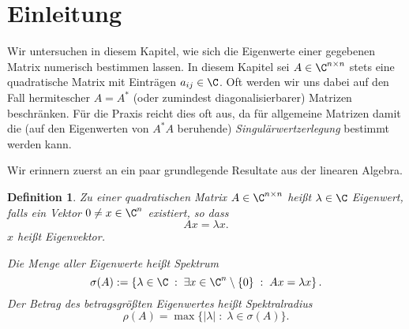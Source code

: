 \documentclass[
]{mycourse}
\theoremstyle{mythm}
\newtheorem{definition}[theorem]{Definition}
\theoremstyle{break}
\newcommand{\dd}{\; : \;}    			      	%
\begin{document}
\section{Einleitung}

Wir untersuchen in diesem Kapitel, wie sich die Eigenwerte einer gegebenen Matrix numerisch bestimmen lassen.
In diesem Kapitel sei $A\in \C^{n\times n}$ stets eine quadratische Matrix mit Einträgen $a_{ij}\in \C$.
Oft werden wir uns dabei auf den Fall hermitescher $A=A^*$ (oder zumindest diagonalisierbarer) Matrizen beschränken. 
Für die Praxis reicht dies oft aus, da für allgemeine Matrizen damit die (auf den Eigenwerten von $A^*A$ beruhende)
\emph{Singulärwertzerlegung} bestimmt werden kann.

Wir erinnern zuerst an ein paar grundlegende Resultate aus der linearen Algebra.

\begin{definition}
Zu einer quadratischen Matrix $A\in \C^{n\times n}$ heißt $\lambda\in \C$ \emph{Eigenwert}, falls ein Vektor
$0\neq x\in \C^n$ existiert, so dass
\[
Ax=\lambda x.
\]
$x$ heißt \emph{Eigenvektor}. 

Die Menge aller Eigenwerte heißt \emph{Spektrum}
\[
\sigma(A):=\left\{ \lambda\in \C \dd \exists x\in \C^n\setminus\{0\} \dd Ax=\lambda x \right\}.
\]
Der Betrag des betragsgrößten Eigenwertes heißt \emph{Spektralradius}
\[
\rho(A)=\max\{|\lambda|\dd \lambda\in \sigma(A)\}.
\]
\end{definition}
\end{document}
